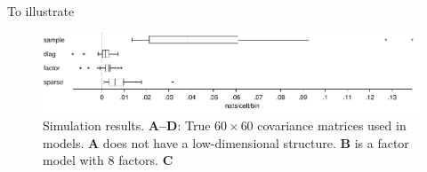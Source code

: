 To illustrate 

\begin{figure}
\centering
\includegraphics[width=1.0\textwidth]{figures/Figure3.pdf}
\caption{
Simulation results.
\textbf{A--D}: True $60\times60$ covariance matrices used in models. \textbf{A} does not have a low-dimensional structure.  \textbf{B} is a factor model with 8 factors. \textbf{C}
}\label{fig:03}
\end{figure}



